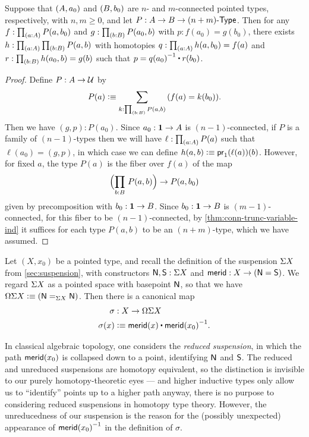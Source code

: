 \begin{lem}\label{thm:wedge-connectivity}
  Suppose that $\pairr{A,a_0}$ and $\pairr{B,b_0}$ are $n$- and $m$-connected pointed types, respectively, with $n,m\geq0$, and let $P:A\to B\to \ntype{(n+m)}$.  Then for any ${f:\prd{a:A} P(a,b_0)}$ and ${g:\prd{b:B} P(a_0,b)}$ with $p:f(a_0) = g(b_0)$, there exists $h:\prd{a:A}{b:B} P(a,b)$ with homotopies $q:\prd{a:A} h(a,b_0)=f(a)$ and $r:\prd{b:B} h(a_0,b)=g(b)$ such that $p = \opp{q(a_0)} \ct r(b_0)$.
\end{lem}
\begin{proof}
  Define $P:A\to\type$ by
  \[ P(a) \defeq \sm{k:\prd{b:B} P(a,b)} (f(a) = k(b_0)). \]
  Then we have $(g,p):P(a_0)$.
  Since $a_0:\unit\to A$ is $(n-1)$-connected, if $P$ is a family of $(n-1)$-types then we will have $\ell:\prd{a:A} P(a)$ such that $\ell(a_0) = (g,p)$, in which case we can define $h(a,b) \defeq \proj1(\ell(a))(b)$.
  However, for fixed $a$, the type $P(a)$ is the fiber over $f(a)$ of the map
  \[ \Parens{\prd{b:B} P(a,b) } \to P(a,b_0) \]
  given by precomposition with $b_0:\unit\to B$.
  Since $b_0:\unit\to B$ is $(m-1)$-connected, for this fiber to be $(n-1)$-connected, by \autoref{thm:conn-trunc-variable-ind} it suffices for each type $P(a,b)$ to be an $(n+m)$-type, which we have assumed.
\end{proof}

Let $(X,x_0)$ be a pointed type, and recall the definition of the suspension $\susp X$ from \autoref{sec:suspension}, with constructors $\north,\south:\susp X$ and $\merid:X \to (\north=\south)$.
We regard $\susp X$ as a pointed space with basepoint $\north$, so that we have $\Omega\susp X \defeq (\id[\susp X]\north\north)$.
Then there is a canonical map
\begin{align*}
  \sigma &: X \to \Omega\susp X\\
  \sigma(x) &\defeq \merid(x) \ct \opp{\merid(x_0)}.
\end{align*}

\begin{rmk}
  In classical algebraic topology, one considers the \emph{reduced suspension}, in which the path $\merid(x_0)$ is collapsed down to a point, identifying $\north$ and $\south$.
  The reduced and unreduced suspensions are homotopy equivalent, so the distinction is invisible to our purely homotopy-theoretic eyes --- and higher inductive types only allow us to ``identify'' points up to a higher path anyway, there is no purpose to considering reduced suspensions in homotopy type theory.
  However, the unreducedness of our suspension is the reason for the (possibly unexpected) appearance of $\opp{\merid(x_0)}$ in the definition of $\sigma$.
\end{rmk}

